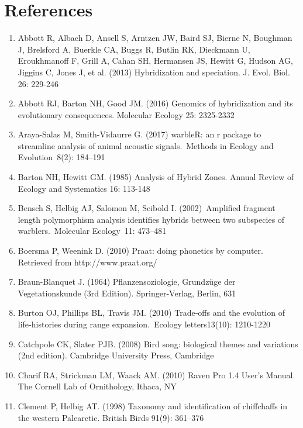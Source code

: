 \documentclass[11pt,a4paper]{article}
\begin{document}
\section{References}


\begin{enumerate}%
\item Abbott R, Albach D, Ansell S, Arntzen JW, Baird SJ, Bierne N, Boughman J, Brelsford A, Buerkle CA, Buggs R, Butlin RK, Dieckmann U, Eroukhmanoff F, Grill A, Cahan SH, Hermansen JS, Hewitt G, Hudson AG, Jiggins C, Jones J, et al. (2013) Hybridization and speciation. J. Evol. Biol. 26: 229-246
\item Abbott RJ, Barton NH, Good JM. (2016) Genomics of hybridization and its evolutionary consequences. Molecular Ecology 25: 2325-2332 
\item Araya-Salas M, Smith-Vidaurre G. (2017) warbleR: an r package to streamline analysis of animal acoustic signals. Methods in Ecology and Evolution 8(2): 184–191
\item Barton NH, Hewitt GM. (1985) Analysis of Hybrid Zones. Annual Review of Ecology and Systematics 16: 113-148
\item Bensch S, Helbig AJ, Salomon M, Seibold I. (2002) Amplified fragment length polymorphism analysis identifies hybrids between two subspecies of warblers. Molecular Ecology 11: 473–481
\item Boersma P, Weenink D. (2010) Praat: doing phonetics by computer. Retrieved from http://www.praat.org/
\item Braun-Blanquet J. (1964) Pflanzensoziologie, Grundzüge der Vegetationskunde (3rd Edition). Springer-Verlag, Berlin, 631
\item Burton OJ, Phillips BL, Travis JM. (2010) Trade‐offs and the evolution of life‐histories during range expansion. Ecology letters13(10): 1210-1220
\item Catchpole CK, Slater PJB. (2008) Bird song: biological themes and variations (2nd edition). Cambridge University Press, Cambridge
\item Charif RA, Strickman LM, Waack AM. (2010) Raven Pro 1.4 User's Manual. The Cornell Lab of Ornithology, Ithaca, NY
\item Clement P, Helbig AT. (1998) Taxonomy and identification of chiffchaffs in the western Palearctic. British Birds 91(9): 361–376

\end{enumerate}
\end{document}
